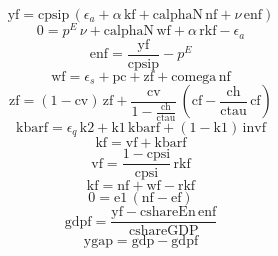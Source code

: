 \begin{dmath}
{{\mathrm{yf}}}={{\mathrm{cpsip}}}\, \left({{\epsilon_{a}}}+{{\alpha}}\, {{\mathrm{kf}}}+{{\mathrm{calphaN}}}\, {{\mathrm{nf}}}+{{\nu}}\, {{\mathrm{enf}}}\right)
\end{dmath}
\begin{dmath}
0={{p^{E}}}\, {{\nu}}+{{\mathrm{calphaN}}}\, {{\mathrm{wf}}}+{{\alpha}}\, {{\mathrm{rkf}}}-{{\epsilon_{a}}}
\end{dmath}
\begin{dmath}
{{\mathrm{enf}}}=\frac{{{\mathrm{yf}}}}{{{\mathrm{cpsip}}}}-{{p^{E}}}
\end{dmath}
\begin{dmath}
{{\mathrm{wf}}}={{\epsilon_{s}}}+{{\mathrm{pc}}}+{{\mathrm{zf}}}+{{\mathrm{comega}}}\, {{\mathrm{nf}}}
\end{dmath}
\begin{dmath}
{{\mathrm{zf}}}=\left(1-{{\mathrm{cv}}}\right)\, {{\mathrm{zf}}}+\frac{{{\mathrm{cv}}}}{1-\frac{{{\mathrm{ch}}}}{{{\mathrm{ctau}}}}}\, \left({{\mathrm{cf}}}-\frac{{{\mathrm{ch}}}}{{{\mathrm{ctau}}}}\, {{\mathrm{cf}}}\right)
\end{dmath}
\begin{dmath}
{{\mathrm{kbarf}}}={{\epsilon_{q}}}\, {{\mathrm{k2}}}+{{\mathrm{k1}}}\, {{\mathrm{kbarf}}}+\left(1-{{\mathrm{k1}}}\right)\, {{\mathrm{invf}}}
\end{dmath}
\begin{dmath}
{{\mathrm{kf}}}={{\mathrm{vf}}}+{{\mathrm{kbarf}}}
\end{dmath}
\begin{dmath}
{{\mathrm{vf}}}=\frac{1-{{\mathrm{cpsi}}}}{{{\mathrm{cpsi}}}}\, {{\mathrm{rkf}}}
\end{dmath}
\begin{dmath}
{{\mathrm{kf}}}={{\mathrm{nf}}}+{{\mathrm{wf}}}-{{\mathrm{rkf}}}
\end{dmath}
\begin{dmath}
0={{\mathrm{e1}}}\, \left({{\mathrm{nf}}}-{{\mathrm{ef}}}\right)
\end{dmath}
\begin{dmath}
{{\mathrm{gdpf}}}=\frac{{{\mathrm{yf}}}-{{\mathrm{cshareEn}}}\, {{\mathrm{enf}}}}{{{\mathrm{cshareGDP}}}}
\end{dmath}
\begin{dmath}
{{\mathrm{ygap}}}={{\mathrm{gdp}}}-{{\mathrm{gdpf}}}
\end{dmath}
